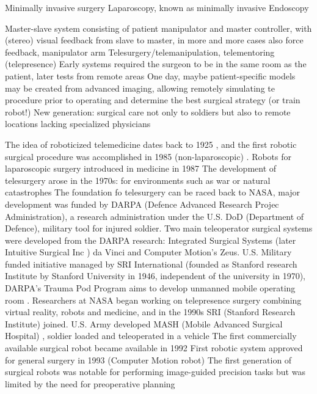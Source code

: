 Minimally invasive surgery
Laparoscopy, known as minimally invasive
Endoscopy


Master-slave system consisting of patient manipulator and master controller, with (stereo) visual feedback from slave to master, in more and more cases also force feedback, manipulator arm
Telesurgery/telemanipulation, telementoring (telepresence)
Early systems required the surgeon to be in the same room as the patient, later tests from remote areas
One day, maybe patient-specific models may be created from advanced imaging, allowing  remotely simulating te procedure prior to operating and determine the best surgical strategy (or train robot!)
New generation: surgical care not only to soldiers but also to remote locations lacking specialized physicians


The idea of roboticized telemedicine dates back to 1925 \cite{bib:telemed_predict}, and the first robotic surgical procedure was accomplished in 1985 (non-laparoscopic) \cite{bib:telesurg_history}. %
Robots for laparoscopic surgery introduced in medicine in 1987 \cite{bib:brown_univ}
The development of telesurgery arose in the 1970s: for environments such as war or natural catastrophes
The foundation fo telesurgery can be raced back to NASA, major development was funded by DARPA (Defence Advanced Research Projec Administration), a research administration under the U.S. DoD (Department of Defence), military tool for injured soldier.
Two main teleoperator surgical systems were developed from the DARPA research: Integrated Surgical Systems (later Intuitive Surgical Inc \cite{bib:brown_univ}) da Vinci and Computer Motion's Zeus. \cite{bib:telesurg_history}
U.S. Military funded initiative managed by SRI International (founded as Stanford research Institute by Stanford University in 1946, independent of the university in 1970), DARPA's Trauma Pod Program aims to develop unmanned mobile operating room \cite{bib:docatadist}.
Researchers at NASA began working on telepresence surgery combining virtual reality, robots and medicine, and in the 1990s SRI (Stanford Research Institute) joined. \cite{bib:brown_univ}
U.S. Army developed MASH (Mobile Advanced Surgical Hospital) \cite{bib:brown_univ}, soldier loaded and teleoperated in a vehicle
The first commercially available surgical robot became available in 1992\cite{bib:telesurg_history}
First robotic system approved for general surgery in 1993 (Computer Motion robot)
The first generation of surgical robots was notable for performing image-guided precision tasks but was limited by the need for preoperative planning
